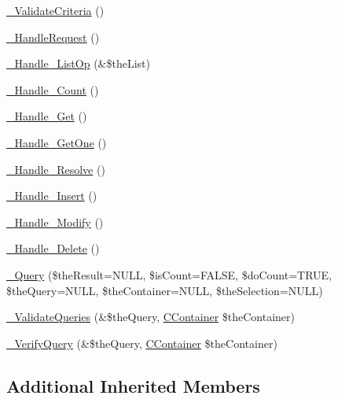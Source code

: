 \begin{DoxyCompactItemize}
\hyperlink{class_c_data_wrapper_ac698ae477425e609df6c707fdb60a09f}{\-\_\-\-Validate\-Criteria} ()
\item 
\hyperlink{class_c_data_wrapper_a873fe1808fb645b01424caa975ae6b4e}{\-\_\-\-Handle\-Request} ()
\item 
\hyperlink{class_c_data_wrapper_afc7251c3aad9141599372d6b94904498}{\-\_\-\-Handle\-\_\-\-List\-Op} (\&\$the\-List)
\item 
\hyperlink{class_c_data_wrapper_a96f5e3613e01b469c39711e0367f1d55}{\-\_\-\-Handle\-\_\-\-Count} ()
\item 
\hyperlink{class_c_data_wrapper_acbe6ebfc205a6627281bfc7e921d51a8}{\-\_\-\-Handle\-\_\-\-Get} ()
\item 
\hyperlink{class_c_data_wrapper_a02e30005fdb1d7fd392869bbc92b08ea}{\-\_\-\-Handle\-\_\-\-Get\-One} ()
\item 
\hyperlink{class_c_data_wrapper_a3a8e8dd504dc2ead8826f06f73cbd674}{\-\_\-\-Handle\-\_\-\-Resolve} ()
\item 
\hyperlink{class_c_data_wrapper_a8c194665e3bce2f214ad9d7cfeecb19b}{\-\_\-\-Handle\-\_\-\-Insert} ()
\item 
\hyperlink{class_c_data_wrapper_aab0ed289574b05800670783825fc4a23}{\-\_\-\-Handle\-\_\-\-Modify} ()
\item 
\hyperlink{class_c_data_wrapper_a9d5f015b9ed7f3062105b846d50e4bc8}{\-\_\-\-Handle\-\_\-\-Delete} ()
\item 
\hyperlink{class_c_data_wrapper_ae9a8755012f6ed16d64a0462ae08ec6b}{\-\_\-\-Query} (\$the\-Result=N\-U\-L\-L, \$is\-Count=F\-A\-L\-S\-E, \$do\-Count=T\-R\-U\-E, \$the\-Query=N\-U\-L\-L, \$the\-Container=N\-U\-L\-L, \$the\-Selection=N\-U\-L\-L)
\item 
\hyperlink{class_c_data_wrapper_ae7ccf4b5e3fa27bfa337c8b2c752db33}{\-\_\-\-Validate\-Queries} (\&\$the\-Query, \hyperlink{class_c_container}{C\-Container} \$the\-Container)
\item 
\hyperlink{class_c_data_wrapper_ae1c1d4975d08d10165f6f4dc8a7751da}{\-\_\-\-Verify\-Query} (\&\$the\-Query, \hyperlink{class_c_container}{C\-Container} \$the\-Container)
\end{DoxyCompactItemize}
\subsection*{Additional Inherited Members}


